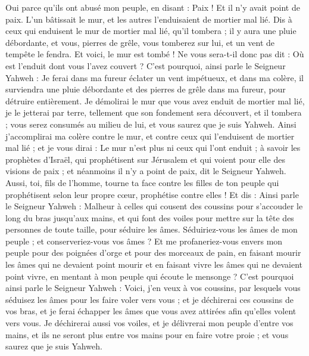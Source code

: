 \begin{multicols}{2}
Oui parce qu'ils ont abusé mon peuple, en disant : Paix ! Et il n'y avait point de paix. L'un bâtissait le mur, et les autres l'enduisaient de mortier mal lié.
Dis à ceux qui enduisent le mur de mortier mal lié, qu'il tombera ; il y aura une pluie débordante, et vous, pierres de grêle, vous tomberez sur lui, et un vent de tempête le fendra.
Et voici, le mur est tombé ! Ne vous sera-t-il donc pas dit : Où est l'enduit dont vous l'avez couvert ?
C'est pourquoi, ainsi parle le Seigneur Yahweh : Je ferai dans ma fureur éclater un vent impétueux, et dans ma colère, il surviendra une pluie débordante et des pierres de grêle dans ma fureur, pour détruire entièrement.
Je démolirai le mur que vous avez enduit de mortier mal lié, je le jetterai par terre, tellement que son fondement sera découvert, et il tombera ; vous serez consumés au milieu de lui, et vous saurez que je suis Yahweh.
Ainsi j'accomplirai ma colère contre le mur, et contre ceux qui l'enduisent de mortier mal lié ; et je vous dirai : Le mur n'est plus ni ceux qui l'ont enduit ;
à savoir les prophètes d'Israël, qui prophétisent sur Jérusalem et qui voient pour elle des visions de paix ; et néanmoins il n'y a point de paix, dit le Seigneur Yahweh.
Aussi, toi, fils de l'homme, tourne ta face contre les filles de ton peuple qui prophétisent selon leur propre cœur, prophétise contre elles !
 Et dis : Ainsi parle le Seigneur Yahweh : Malheur à celles qui cousent des coussins pour s'accouder le long du bras jusqu'aux mains, et qui font des voiles pour mettre sur la tête des personnes de toute taille, pour séduire les âmes. Séduiriez-vous les âmes de mon peuple ; et conserveriez-vous vos âmes ?
Et me profaneriez-vous envers mon peuple pour des poignées d'orge et pour des morceaux de pain, en faisant mourir les âmes qui ne devaient point mourir et en faisant vivre les âmes qui ne devaient point vivre, en mentant à mon peuple qui écoute le mensonge ?
C'est pourquoi ainsi parle le Seigneur Yahweh : Voici, j'en veux à vos coussins, par lesquels vous séduisez les âmes pour les faire voler vers vous ; et je déchirerai ces coussins de vos bras, et je ferai échapper les âmes que vous avez attirées afin qu'elles volent vers vous.
Je déchirerai aussi vos voiles, et je délivrerai mon peuple d'entre vos mains, et ils ne seront plus entre vos mains pour en faire votre proie ; et vous saurez que je suis Yahweh.

\end{multicols}
